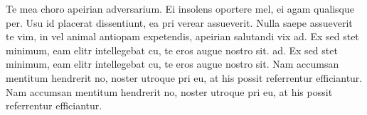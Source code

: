 Te mea choro apeirian adversarium. Ei insolens oportere mel, ei agam qualisque
per. Usu id placerat dissentiunt, ea pri verear assueverit. Nulla saepe
assueverit te vim, in vel animal antiopam expetendis, apeirian salutandi vix
ad. Ex sed stet minimum, eam elitr intellegebat cu, te eros augue nostro sit.
ad. Ex sed stet minimum, eam elitr intellegebat cu, te eros augue nostro sit.
Nam accumsan mentitum hendrerit no, noster utroque pri eu, at his possit
referrentur efficiantur.
Nam accumsan mentitum hendrerit no, noster utroque pri eu, at his possit
referrentur efficiantur.
